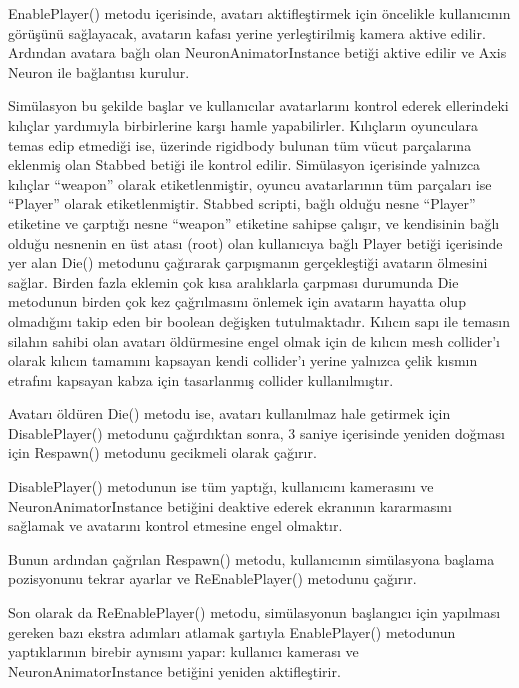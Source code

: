\documentclass[a4paper, 12pt, titlepage]{article}
\begin{document}
EnablePlayer() metodu içerisinde, avatarı aktifleştirmek için öncelikle kullanıcının görüşünü
sağlayacak, avatarın kafası yerine yerleştirilmiş kamera aktive edilir. Ardından avatara bağlı olan
NeuronAnimatorInstance betiği aktive edilir ve Axis Neuron ile bağlantısı kurulur.

Simülasyon bu şekilde başlar ve kullanıcılar avatarlarını kontrol ederek ellerindeki kılıçlar
yardımıyla birbirlerine karşı hamle yapabilirler. Kılıçların oyunculara temas edip etmediği ise,
üzerinde rigidbody bulunan tüm vücut parçalarına eklenmiş olan Stabbed betiği ile kontrol edilir.
Simülasyon içerisinde yalnızca kılıçlar “weapon” olarak etiketlenmiştir, oyuncu avatarlarının tüm
parçaları ise “Player” olarak etiketlenmiştir. Stabbed scripti, bağlı olduğu nesne “Player”
etiketine ve çarptığı nesne “weapon” etiketine sahipse çalışır, ve kendisinin bağlı olduğu nesnenin
en üst atası (root) olan kullanıcıya bağlı Player betiği içerisinde yer alan Die() metodunu
çağırarak çarpışmanın gerçekleştiği avatarın ölmesini sağlar. Birden fazla eklemin çok kısa
aralıklarla çarpması durumunda Die metodunun birden çok kez çağrılmasını önlemek için avatarın
hayatta olup olmadığını takip eden bir boolean değişken tutulmaktadır. Kılıcın sapı ile temasın
silahın sahibi olan avatarı öldürmesine engel olmak için de kılıcın mesh collider’ı olarak kılıcın
tamamını kapsayan kendi collider’ı yerine yalnızca çelik kısmın etrafını kapsayan kabza için
tasarlanmış collider kullanılmıştır.

Avatarı öldüren Die() metodu ise, avatarı kullanılmaz hale getirmek için DisablePlayer() metodunu
çağırdıktan sonra, 3 saniye içerisinde yeniden doğması için Respawn() metodunu gecikmeli olarak
çağırır.

DisablePlayer() metodunun ise tüm yaptığı, kullanıcını kamerasını ve NeuronAnimatorInstance
betiğini deaktive ederek ekranının kararmasını sağlamak ve avatarını kontrol etmesine engel
olmaktır.

Bunun ardından çağrılan Respawn() metodu, kullanıcının simülasyona başlama pozisyonunu tekrar
ayarlar ve ReEnablePlayer() metodunu çağırır.

Son olarak da ReEnablePlayer() metodu, simülasyonun başlangıcı için yapılması gereken bazı ekstra
adımları atlamak şartıyla EnablePlayer() metodunun yaptıklarının birebir aynısını yapar: kullanıcı
kamerası ve NeuronAnimatorInstance betiğini yeniden aktifleştirir.
\newpage
\vfill
\end{document}
